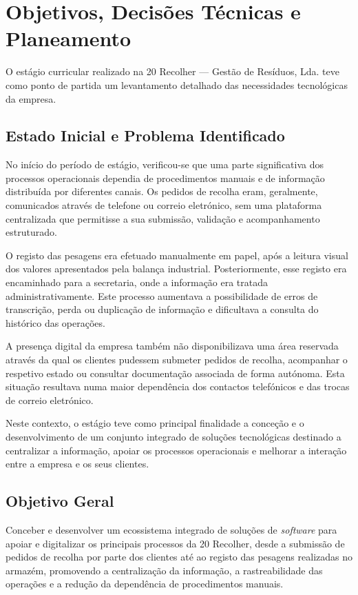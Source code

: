 \chapter{Objetivos, Decisões Técnicas e Planeamento}\label{chap3}


O estágio curricular realizado na 20 Recolher --- Gestão de Resíduos, Lda. teve como ponto de partida um levantamento detalhado das necessidades tecnológicas da empresa.

\section{Estado Inicial e Problema Identificado}

No início do período de estágio, verificou-se que uma parte significativa dos processos operacionais dependia de procedimentos manuais e de informação distribuída por diferentes canais. Os pedidos de recolha eram, geralmente, comunicados através de telefone ou correio eletrónico, sem uma plataforma centralizada que permitisse a sua submissão, validação e acompanhamento estruturado.

O registo das pesagens era efetuado manualmente em papel, após a leitura visual dos valores apresentados pela balança industrial. Posteriormente, esse registo era encaminhado para a secretaria, onde a informação era tratada administrativamente. Este processo aumentava a possibilidade de erros de transcrição, perda ou duplicação de informação e dificultava a consulta do histórico das operações.

A presença digital da empresa também não disponibilizava uma área reservada através da qual os clientes pudessem submeter pedidos de recolha, acompanhar o respetivo estado ou consultar documentação associada de forma autónoma. Esta situação resultava numa maior dependência dos contactos telefónicos e das trocas de correio eletrónico.

Neste contexto, o estágio teve como principal finalidade a conceção e o desenvolvimento de um conjunto integrado de soluções tecnológicas destinado a centralizar a informação, apoiar os processos operacionais e melhorar a interação entre a empresa e os seus clientes.

\section{Objetivo Geral}

Conceber e desenvolver um ecossistema integrado de soluções de \textit{software} para apoiar e digitalizar os principais processos da 20 Recolher, desde a submissão de pedidos de recolha por parte dos clientes até ao registo das pesagens realizadas no armazém, promovendo a centralização da informação, a rastreabilidade das operações e a redução da dependência de procedimentos manuais.

